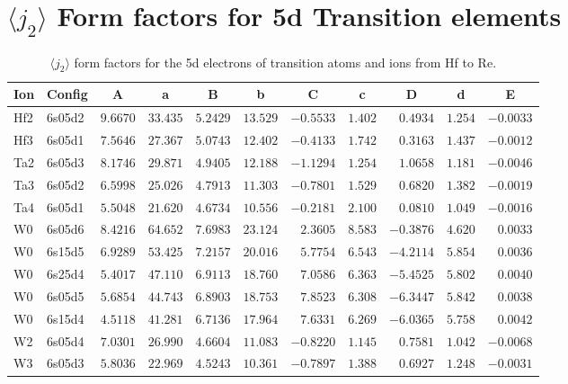 \section{{\large $\langle j_2\rangle$} Form factors for 5d Transition elements}
\begin{table}[H]
 \caption{$\langle j_2\rangle$ form factors for the 5d electrons of transition atoms and ions from Hf to Re.\cite{kob:11}}
 \label{5dj2}
 \vspace{1ex}
 {\tablesize
\begin{tabular}{llrrrrrrrrr}
\hline
\multicolumn{1}{c}{ Ion}&\multicolumn{1}{c}{ Config}&\multicolumn{1}{c}{ A }&\multicolumn{1}{c}{  a }&\multicolumn{1}{c}{B }&\multicolumn{1}{c}{ b }&\multicolumn{1}{c}{ C }&\multicolumn{1}{c}{ c }&\multicolumn{1}{c}{ D }&\multicolumn{1}{c}{ d }&\multicolumn{1}{c}{E}\\
\hline
Hf2 & 6s05d2 &$9.6670$ &$33.435$ &$5.2429$ &$13.529$ &$-0.5533$ &$1.402$ &$0.4934$ &$1.254$ &$-0.0033$ \\
Hf3 & 6s05d1 &$7.5646$ &$27.367$ &$5.0743$ &$12.402$ &$-0.4133$ &$1.742$ &$0.3163$ &$1.437$ &$-0.0012$ \\
Ta2 & 6s05d3 &$8.1746$ &$29.871$ &$4.9405$ &$12.188$ &$-1.1294$ &$1.254$ &$1.0658$ &$1.181$ &$-0.0046$ \\
Ta3 & 6s05d2 &$6.5998$ &$25.026$ &$4.7913$ &$11.303$ &$-0.7801$ &$1.529$ &$0.6820$ &$1.382$ &$-0.0019$ \\
Ta4 & 6s05d1 &$5.5048$ &$21.620$ &$4.6734$ &$10.556$ &$-0.2181$ &$2.100$ &$0.0810$ &$1.049$ &$-0.0016$ \\
W0 & 6s05d6 &$8.4216$ &$64.652$ &$7.6983$ &$23.124$ &$2.3605$ &$8.583$ &$-0.3876$ &$4.620$ &$0.0033$ \\
W0 & 6s15d5 &$6.9289$ &$53.425$ &$7.2157$ &$20.016$ &$5.7754$ &$6.543$ &$-4.2114$ &$5.854$ &$0.0036$ \\
W0 & 6s25d4 &$5.4017$ &$47.110$ &$6.9113$ &$18.760$ &$7.0586$ &$6.363$ &$-5.4525$ &$5.802$ &$0.0040$ \\
W0 & 6s05d5 &$5.6854$ &$44.743$ &$6.8903$ &$18.753$ &$7.8523$ &$6.308$ &$-6.3447$ &$5.842$ &$0.0038$ \\
W0 & 6s15d4 &$4.5118$ &$41.281$ &$6.7136$ &$17.964$ &$7.6331$ &$6.269$ &$-6.0365$ &$5.758$ &$0.0042$ \\
W2 & 6s05d4 &$7.0301$ &$26.990$ &$4.6604$ &$11.083$ &$-0.8220$ &$1.145$ &$0.7581$ &$1.042$ &$-0.0068$ \\
W3 & 6s05d3 &$5.8036$ &$22.969$ &$4.5243$ &$10.361$ &$-0.7897$ &$1.388$ &$0.6927$ &$1.248$ &$-0.0031$ \\

\end{tabular}}
\end{table}
